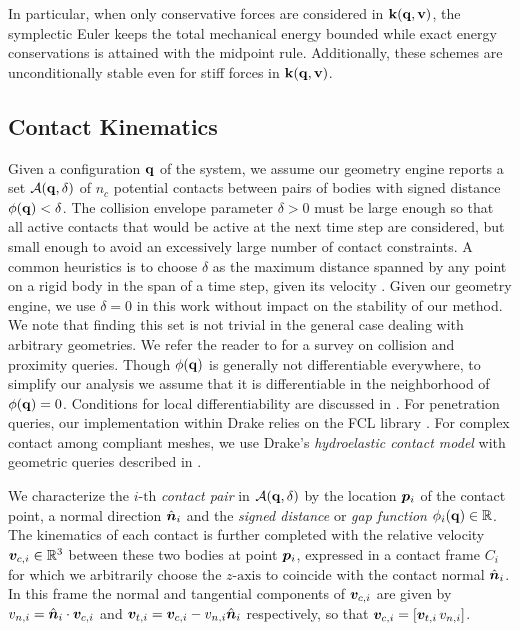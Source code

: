 In particular, when only conservative forces are considered in
${\mathbf{k}}({\mathbf{q}},{\mathbf{v}})$, the symplectic Euler keeps the total mechanical energy
bounded while exact energy conservations is attained with the midpoint rule.
Additionally, these schemes are unconditionally stable even for stiff forces in
${\mathbf{k}}({\mathbf{q}},{\mathbf{v}})$.

\subsection{Contact Kinematics}
\label{sec:contact_modeling}

Given a configuration ${\mathbf{q}}$ of the system, we assume our geometry engine
reports a set $\mathcal{A}({\mathbf{q}},\delta)$ of $n_c$ potential contacts between
pairs of bodies with signed distance $\phi({\mathbf{q}}) < \delta$. The collision
envelope parameter $\delta > 0$ must be large enough so that all active contacts
that would be active at the next time step are considered, but small enough to
avoid an excessively large number of contact constraints. A common heuristics is
to choose $\delta$ as the maximum distance spanned by any point on a rigid body
in the span of a time step, given its velocity \cite{bib:anitescu2010}. Given
our geometry engine, we use $\delta = 0$ in this work without impact on the
stability of our method. We note that finding this set is not trivial in the
general case dealing with arbitrary geometries. We refer the reader to
\cite{bib:hadap2004collision,bib:lin2017collision, bib:erleben2018methodology,
bib:flores2021contact} for a survey on collision and proximity queries. Though
$\phi({\mathbf{q}})$ is generally not differentiable everywhere, to simplify our
analysis we assume that it is differentiable in the neighborhood of
$\phi({\mathbf{q}}) = 0$. Conditions for local differentiability are discussed in
\cite{bib:anitescu2004constraint}. For penetration queries, our implementation
within Drake \cite{bib:drake} relies on the FCL library \cite{bib:fcl}. For
complex contact among compliant meshes, we use Drake's \emph{hydroelastic
contact model} with geometric queries described in \cite{bib:elandt2019pressure,
bib:masterjohn2021discrete}.

We characterize the $i\text{-th}$ \emph{contact pair} in
$\mathcal{A}({\mathbf{q}},\delta)$ by the location ${\bm{p}}_i$ of the contact point, a
normal direction $\hat{{\bm{n}}}_i$ and the \emph{signed distance} or \emph{gap
function} $\phi_i({\mathbf{q}})\in\mathbb{R}$. The kinematics of each contact is
further completed with the relative velocity ${\bm{v}}_{c,i}\in\mathbb{R}^3$
between these two bodies at point ${\bm{p}}_i$, expressed in a contact frame $C_i$
for which we arbitrarily choose the $z\text{-axis}$ to coincide with the contact
normal $\hat{{\bm{n}}}_i$. In this frame the normal and tangential components of
${\bm{v}}_{c,i}$ are given by $v_{n,i} = \hat{{\bm{n}}}_i\cdot{\bm{v}}_{c,i}$ and
${\bm{v}}_{t,i} = {\bm{v}}_{c,i}-v_{n,i}\hat{{\bm{n}}}_i$ respectively, so that
${\bm{v}}_{c,i}=[{\bm{v}}_{t,i}\,v_{n,i}]$.

